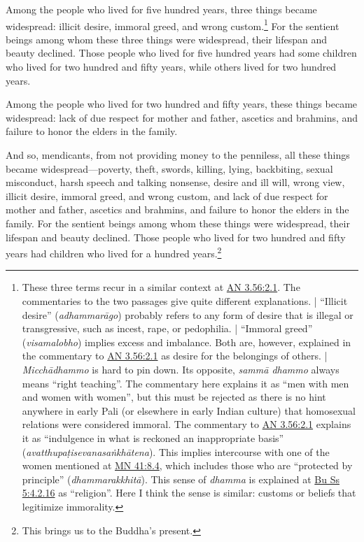 \documentclass[12pt,openany]{book}%
\begin{document}
Among the people who lived for five hundred years, three things became widespread: illicit desire, immoral greed, and wrong custom.\footnote{These three terms recur in a similar context at \href{https://suttacentral.net/an3.56/en/sujato\#2.1}{AN 3.56:2.1}. The commentaries to the two passages give quite different explanations. | “Illicit desire” (\textit{\textsanskrit{adhammarāgo}}) probably refers to any form of desire that is illegal or transgressive, such as incest, rape, or pedophilia. | “Immoral greed” (\textit{visamalobho}) implies excess and imbalance. Both are, however, explained in the commentary to \href{https://suttacentral.net/an3.56/en/sujato\#2.1}{AN 3.56:2.1} as desire for the belongings of others. | \textit{\textsanskrit{Micchādhammo}} is hard to pin down. Its opposite, \textit{\textsanskrit{sammā} dhammo} always means “right teaching”. The commentary here explains it as “men with men and women with women”, but this must be rejected as there is no hint anywhere in early Pali (or elsewhere in early Indian culture) that homosexual relations were considered immoral. The commentary to \href{https://suttacentral.net/an3.56/en/sujato\#2.1}{AN 3.56:2.1} explains it as “indulgence in what is reckoned an inappropriate basis” (\textit{\textsanskrit{avatthupaṭisevanasaṅkhātena}}). This implies intercourse with one of the women mentioned at \href{https://suttacentral.net/mn41/en/sujato\#8.4}{MN 41:8.4}, which includes those who are “protected by principle” (\textit{\textsanskrit{dhammarakkhitā}}). This sense of \textit{dhamma} is explained at \href{https://suttacentral.net/pli-tv-bu-vb-ss5/en/sujato\#4.2.16}{Bu Ss 5:4.2.16} as “religion”. Here I think the sense is similar: customs or beliefs that legitimize immorality. } For the sentient beings among whom these three things were widespread, their lifespan and beauty declined. Those people who lived for five hundred years had some children who lived for two hundred and fifty years, while others lived for two hundred years. 

Among the people who lived for two hundred and fifty years, these things became widespread: lack of due respect for mother and father, ascetics and brahmins, and failure to honor the elders in the family. 

And so, mendicants, from not providing money to the penniless, all these things became widespread—poverty, theft, swords, killing, lying, backbiting, sexual misconduct, harsh speech and talking nonsense, desire and ill will, wrong view, illicit desire, immoral greed, and wrong custom, and lack of due respect for mother and father, ascetics and brahmins, and failure to honor the elders in the family. For the sentient beings among whom these things were widespread, their lifespan and beauty declined. Those people who lived for two hundred and fifty years had children who lived for a hundred years.\footnote{This brings us to the Buddha’s present. } 
\end{document}
